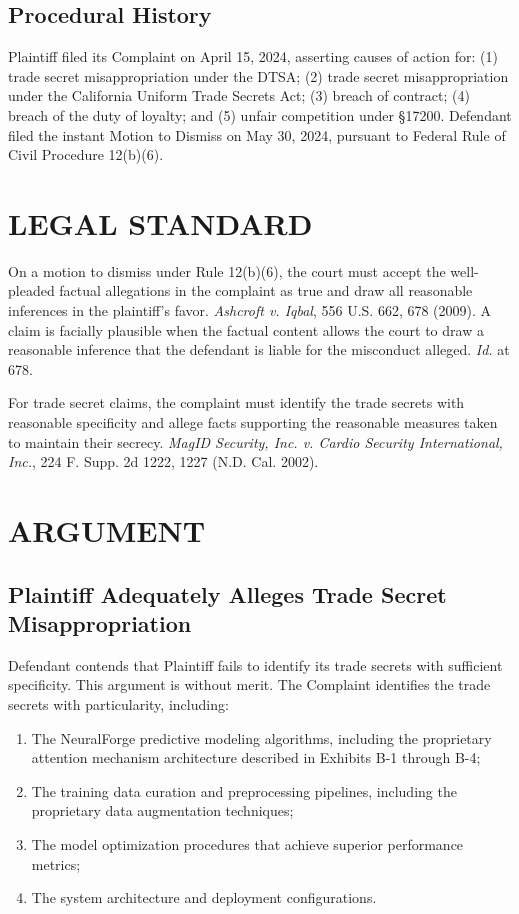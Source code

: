 \documentclass[
    language=english,
    doctype=legal-brief,
    institution=none,
]{../../omnilatex}
\begin{document}
\subsection{Procedural History}
Plaintiff filed its Complaint on April 15, 2024, asserting causes of action for: (1) trade secret misappropriation under the DTSA; (2) trade secret misappropriation under the California Uniform Trade Secrets Act; (3) breach of contract; (4) breach of the duty of loyalty; and (5) unfair competition under \S 17200. Defendant filed the instant Motion to Dismiss on May 30, 2024, pursuant to Federal Rule of Civil Procedure 12(b)(6).

\section{LEGAL STANDARD}

On a motion to dismiss under Rule 12(b)(6), the court must accept the well-pleaded factual allegations in the complaint as true and draw all reasonable inferences in the plaintiff's favor. \textit{Ashcroft v. Iqbal}, 556 U.S. 662, 678 (2009). A claim is facially plausible when the factual content allows the court to draw a reasonable inference that the defendant is liable for the misconduct alleged. \textit{Id.} at 678.

For trade secret claims, the complaint must identify the trade secrets with reasonable specificity and allege facts supporting the reasonable measures taken to maintain their secrecy. \textit{MagID Security, Inc. v. Cardio Security International, Inc.}, 224 F. Supp. 2d 1222, 1227 (N.D. Cal. 2002).

\section{ARGUMENT}

\subsection{Plaintiff Adequately Alleges Trade Secret Misappropriation}

Defendant contends that Plaintiff fails to identify its trade secrets with sufficient specificity. This argument is without merit. The Complaint identifies the trade secrets with particularity, including:

\begin{enumerate}
    \item The NeuralForge predictive modeling algorithms, including the proprietary attention mechanism architecture described in Exhibits B-1 through B-4;
    \item The training data curation and preprocessing pipelines, including the proprietary data augmentation techniques;
    \item The model optimization procedures that achieve superior performance metrics;
    \item The system architecture and deployment configurations.
\end{enumerate}
\end{document}
